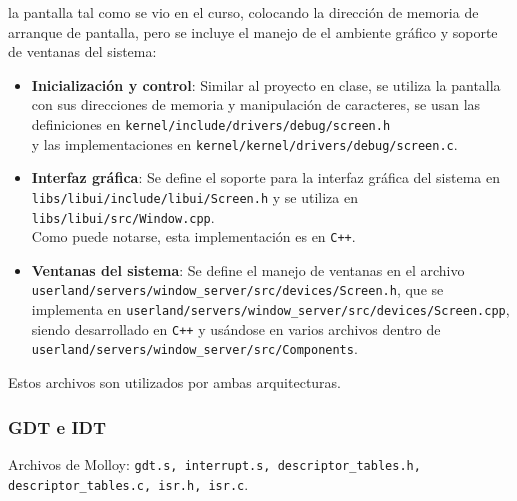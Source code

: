 		la pantalla tal como se vio en el curso, colocando la dirección de memoria de arranque de pantalla, pero se incluye el manejo de el ambiente gráfico y soporte de ventanas del sistema:
		\begin{itemize} \setlength\itemsep{0pt}
			\item \textbf{Inicialización y control}: Similar al proyecto en clase, se utiliza la pantalla con sus direcciones de memoria y manipulación de caracteres, se usan las definiciones en
			\texttt{kernel/include/drivers/debug/screen.h}\\
			y las implementaciones en 
			\texttt{kernel/kernel/drivers/debug/screen.c}.
			
			\item \textbf{Interfaz gráfica}: Se define el soporte para la interfaz gráfica del sistema en 
			\texttt{libs/libui/include/libui/Screen.h} y se utiliza en \\
			\texttt{libs/libui/src/Window.cpp}. \\
			Como puede notarse, esta implementación es en \texttt{C++}.
			
			
			\item \textbf{Ventanas del sistema}: Se define el manejo de ventanas en el archivo \texttt{userland/servers/window\_server/src/devices/Screen.h}, que se implementa en \texttt{userland/servers/window\_server/src/devices/Screen.cpp}, siendo desarrollado en \texttt{C++} y usándose en varios archivos dentro de\\ \texttt{userland/servers/window\_server/src/Components}.
		\end{itemize}
	
		Estos archivos son utilizados por ambas arquitecturas.
	
	
	
	
	
	\subsubsection{GDT e IDT}
		Archivos de Molloy: \texttt{gdt.s, interrupt.s, descriptor\_tables.h, descriptor\_tables.c, isr.h, isr.c}.
		
